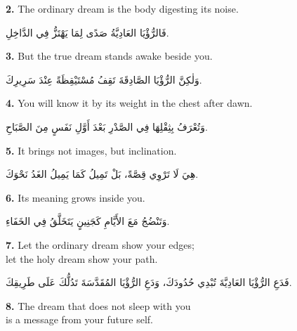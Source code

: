 \documentclass[11pt,a4paper,twoside]{book}
\begin{document}
\vspace{1em}
{\color{indigo}\bfseries 2.}\quad
The ordinary dream is the body digesting its noise.

\begin{flushright}
{\arabicfont
فَالرُّؤْيَا العَادِيَّةُ
صَدًى لِمَا يَهْتَزُّ فِي الدَّاخِلِ.}
\end{flushright}

\vspace{1em}
{\color{indigo}\bfseries 3.}\quad
But the true dream stands awake beside you.

\begin{flushright}
{\arabicfont
وَلٰكِنَّ الرُّؤْيَا الصَّادِقَةَ
تَقِفُ مُسْتَيْقِظَةً عِنْدَ سَرِيرِكَ.}
\end{flushright}

\vspace{1em}
{\color{indigo}\bfseries 4.}\quad
You will know it by its weight in the chest after dawn.

\begin{flushright}
{\arabicfont
وَتُعْرَفُ بِثِقْلِهَا فِي الصَّدْرِ
بَعْدَ أَوَّلِ نَفَسٍ مِنَ الصَّبَاحِ.}
\end{flushright}

\vspace{1em}
{\color{indigo}\bfseries 5.}\quad
It brings not images, but inclination.

\begin{flushright}
{\arabicfont
هِيَ لَا تَرْوِي قِصَّةً،
بَلْ تَمِيلُ كَمَا يَمِيلُ الغَدُ نَحْوَكَ.}
\end{flushright}

\vspace{1em}
{\color{indigo}\bfseries 6.}\quad
Its meaning grows inside you.

\begin{flushright}
{\arabicfont
وَتَنْضُجُ مَعَ الأَيَّامِ
كَجَنِينٍ يَتَخَلَّقُ فِي الخَفَاءِ.}
\end{flushright}

\vspace{1em}
{\color{indigo}\bfseries 7.}\quad
Let the ordinary dream show your edges;\\
let the holy dream show your path.

\begin{flushright}
{\arabicfont
فَدَعِ الرُّؤْيَا العَادِيَّةَ تُبْدِي حُدُودَكَ،
وَدَعِ الرُّؤْيَا المُقَدَّسَةَ تَدُلُّكَ عَلَى طَرِيقِكَ.}
\end{flushright}

\vspace{1em}
{\color{indigo}\bfseries 8.}\quad
The dream that does not sleep with you\\
is a message from your future self.
\end{document}
